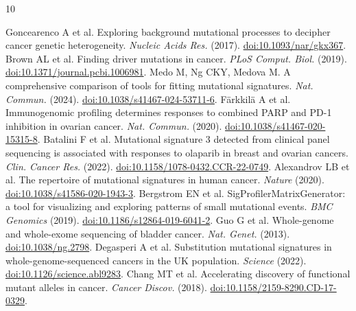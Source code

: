 \documentclass[11pt]{article}
\begin{document}
{\footnotesize\begin{thebibliography}{10}\raggedright\setlength{\itemsep}{1pt}\setlength{\parsep}{0pt}\setlength{\parskip}{0pt}
 Goncearenco A et al. Exploring background mutational processes to decipher cancer genetic heterogeneity. \emph{Nucleic Acids Res.} (2017). \href{https://doi.org/10.1093/nar/gkx367}{doi:10.1093/nar/gkx367}.
 Brown AL et al. Finding driver mutations in cancer. \emph{PLoS Comput. Biol.} (2019). \href{https://doi.org/10.1371/journal.pcbi.1006981}{doi:10.1371/journal.pcbi.1006981}.
 Medo M, Ng CKY, Medova M. A comprehensive comparison of tools for fitting mutational signatures. \emph{Nat. Commun.} (2024). \href{https://doi.org/10.1038/s41467-024-53711-6}{doi:10.1038/s41467-024-53711-6}.
 F\"arkkil\"a A et al. Immunogenomic profiling determines responses to combined PARP and PD-1 inhibition in ovarian cancer. \emph{Nat. Commun.} (2020). \href{https://doi.org/10.1038/s41467-020-15315-8}{doi:10.1038/s41467-020-15315-8}.
 Batalini F et al. Mutational signature 3 detected from clinical panel sequencing is associated with responses to olaparib in breast and ovarian cancers. \emph{Clin. Cancer Res.} (2022). \href{https://doi.org/10.1158/1078-0432.CCR-22-0749}{doi:10.1158/1078-0432.CCR-22-0749}.
 Alexandrov LB et al. The repertoire of mutational signatures in human cancer. \emph{Nature} (2020). \href{https://doi.org/10.1038/s41586-020-1943-3}{doi:10.1038/s41586-020-1943-3}.
 Bergstrom EN et al. SigProfilerMatrixGenerator: a tool for visualizing and exploring patterns of small mutational events. \emph{BMC Genomics} (2019). \href{https://doi.org/10.1186/s12864-019-6041-2}{doi:10.1186/s12864-019-6041-2}.
 Guo G et al. Whole-genome and whole-exome sequencing of bladder cancer. \emph{Nat. Genet.} (2013). \href{https://doi.org/10.1038/ng.2798}{doi:10.1038/ng.2798}.
 Degasperi A et al. Substitution mutational signatures in whole-genome-sequenced cancers in the UK population. \emph{Science} (2022). \href{https://doi.org/10.1126/science.abl9283}{doi:10.1126/science.abl9283}.
 Chang MT et al. Accelerating discovery of functional mutant alleles in cancer. \emph{Cancer Discov.} (2018). \href{https://doi.org/10.1158/2159-8290.CD-17-0329}{doi:10.1158/2159-8290.CD-17-0329}.
\end{thebibliography}}
\end{document}
